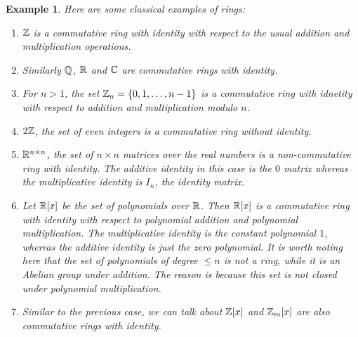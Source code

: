 \documentclass[12pt]{article}
\theoremstyle{plain}
\newtheorem{example}{Example}
\theoremstyle{definition}
\theoremstyle{remark}
\begin{document}
\begin{example}
Here are some classical examples of rings:
\begin{enumerate}
    \item $\mathbb{Z}$ is a commutative ring with identity with respect to the usual addition and multiplication operations.
    \item Similarly $\mathbb{Q}$, $\mathbb{R}$ and $\mathbb{C}$ are commutative rings with identity.
    \item For $n>1$, the set $\mathbb{Z}_n=\{0,1, \dots, n-1\}$ is a commutative ring with idnetity with respect to addition and multiplication modulo $n$.
    \item $2\mathbb{Z}$, the set of even integers is a commutative ring without identity.
    \item $\mathbb{R}^{n\times n}$, the set of $n\times n$ matrices over the real numbers is a non-commutative ring with identity. The additive identity in this case is the $0$ matrix whereas the multiplicative identity is $I_n$, the identity matrix.
    \item Let $\mathbb{R}[x]$ be the set of polynomials over $\mathbb{R}$. Then $\mathbb{R}[x]$ is a commutative ring with identity with respect to polynomial addition and polynomial multiplication. The multiplicative identity is the constant polynomial $1$, whereas the additive identity is just the zero polynomial. It is worth noting here that the set of polynomials of degree $\leq n$ is not a ring, while it is an Abelian group under addition. The reason is because this set is not closed under polynomial multiplication.
    \item Similar to the previous case, we can talk about
    $\mathbb{Z}[x]$ and $\mathbb{Z}_m[x]$ are also commutative rings with identity.
    \end{enumerate}
    \end{example}
\end{document}
